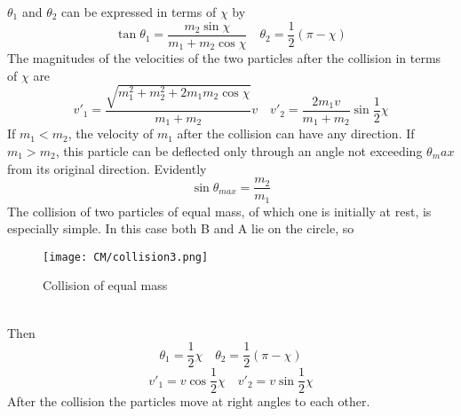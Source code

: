 $\theta_1$ and $\theta_2$ can be expressed in terms of $\chi$ by
\[\tan\theta_1 = \frac{m_2\sin\chi}{m_1 + m_2 \cos\chi} \quad \theta_2 = \frac{1}{2}(\pi - \chi)\]
The magnitudes of the velocities of the two particles after the collision in terms of $\chi$ are
\[v'_1 = \frac{\sqrt{m_1^2 + m_2^2 + 2m_1m_2\cos\chi}}{m_1+m_2}v \quad v'_2 = \frac{2m_1v}{m_1+m_2}\sin\frac{1}{2}\chi\]
If $m_1 < m_2$, the velocity of $m_1$ after the collision can have any direction.
If $m_1 > m_2$, this particle can be deflected only through an angle not exceeding $\theta_max$ from its original direction. Evidently
\[\sin\theta_{max} = \frac{m_2}{m_1}\]
The collision of two particles of equal mass, of which one is initially at rest, is especially simple. In this case both B and A lie on the circle, so
\begin{figure}[!h]
	\centering
	\texttt{[image: CM/collision3.png]}
	\caption{Collision of equal mass}
\end{figure}\\
Then 
\[\theta_1 = \frac{1}{2}\chi \quad \theta_2 = \frac{1}{2}(\pi-\chi)\]
\[v'_1 = v\cos\frac{1}{2}\chi \quad v'_2 = v\sin\frac{1}{2}\chi\]
After the collision the particles move at right angles to each other.

